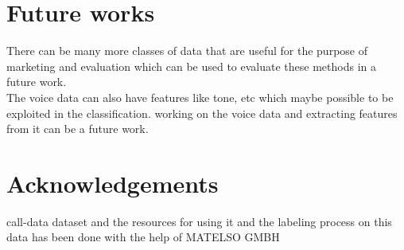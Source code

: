 \section{Future works}
	There can be many more classes of data that are useful for the purpose of marketing and evaluation which can be used to evaluate these methods in a future work.\\
	The voice data can also have features like tone, etc which maybe possible to be exploited in the classification. working on the voice data and extracting features from it can be a future work. 
\section{Acknowledgements}
	call-data dataset and the resources for using it and the labeling process on this data has been done with the help of MATELSO GMBH

%

%
%

